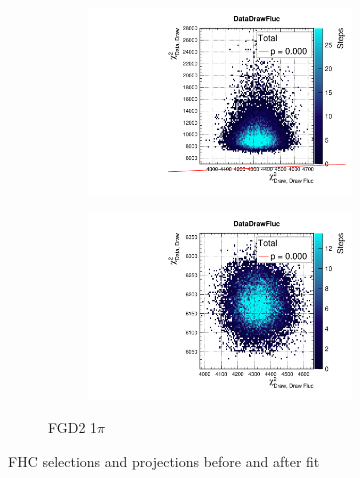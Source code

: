 \begin{figure}[h]
\begin{subfigure}[t]{\textwidth}
\begin{subfigure}[t]{0.24\textwidth}
			\includegraphics[width=\textwidth, trim={0mm 0mm 0mm 8mm}, clip,page=47]{figures/mach3/2018/data/2018a_FixedCov_RedCov_Mpi_Data_merge_PriorPred_procs}
		\end{subfigure}
		\begin{subfigure}[t]{0.24\textwidth}
			\includegraphics[width=\textwidth, trim={0mm 0mm 0mm 8mm}, clip,page=47]{figures/mach3/2018/data/2018a_FixedCov_RedCov_Mpi_Data_merge_PostPredStore_FullLLH_procs}
		\end{subfigure}
		\caption{FGD2 1$\pi$}
	\end{subfigure}
	\caption{FHC selections \pmu and \cosmu projections before and after fit}
	\label{fig:fhc_postfit_0pi_1pi_2018}
\end{figure}

